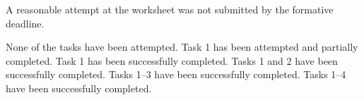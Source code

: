\documentclass{../../../fal_assignment}
\begin{document}
\begin{markingrubric}
		\grade\fail	A reasonable attempt at the worksheet was not submitted by the formative deadline.
		\vspace{\baselineskip}
		
        \grade\fail None of the tasks have been attempted.
		\grade Task 1 has been attempted and partially completed.
		\grade Task 1 has been successfully completed.
		\grade Tasks 1 and 2 have been successfully completed.
		\grade Tasks 1--3 have been successfully completed.
		\grade Tasks 1--4 have been successfully completed.


\end{markingrubric}
\end{document}
